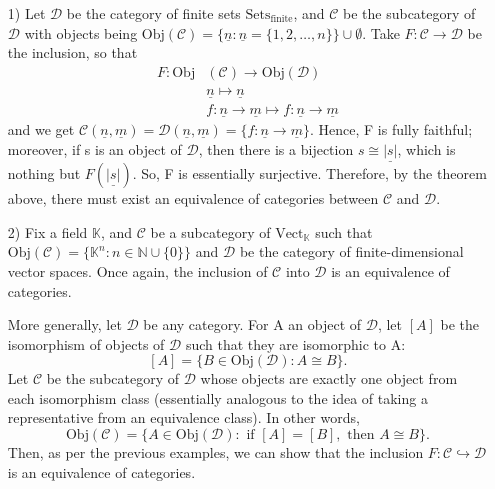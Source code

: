 \documentclass[../category_theory.tex]{subfiles}
\begin{document}
\begin{example}
	\begin{itemize}
		\item[1)]Let \(\mathcal{D}\) be the category of finite sets \(\mathrm{Sets}_{\text{finite}}\), and \(\mathcal{C}\) be the subcategory of \(\mathcal{D}\) with objects being \(\mathrm{Obj}(\mathcal{C})=\{\underline{n}: \underline{n}=\{1,2,\dotsc ,n\}\}\cup \emptyset \). Take \(F:\mathcal{C}\rightarrow \mathcal{D}\) be the inclusion, so that
		      \begin{align*}
			      F:\mathrm{Obj} & (\mathcal{C})\rightarrow \mathrm{Obj}(\mathcal{D})                                       \\
			                     & \underline{n}\mapsto \underline{n}                                                       \\
			                     & f:\underline{n}\rightarrow \underline{m}\mapsto f:\underline{n}\rightarrow \underline{m}
		      \end{align*}
		      and we get \(\mathcal{C}(\underline{n}, \underline{m})=\mathcal{D}(\underline{n},\underline{m})=\{f:\underline{n}\rightarrow \underline{m}\}\). Hence, F is fully faithful; moreover, if s is an object of \(\mathcal{D}\), then there is a bijection \(s\cong \underline{|s|}\), which is nothing but \(F(\underline{|s|})\). So, F is essentially surjective. Therefore, by the theorem above, there must exist an equivalence of categories between \(\mathcal{C}\) and \(\mathcal{D}\).
		\item[2)] Fix a field \(\mathbb{K}\), and \(\mathcal{C}\) be a subcategory of \(\mathrm{Vect}_{\mathbb{K}}\) such that \(\mathrm{Obj}(\mathcal{C})=\{\mathbb{K}^{n}: n\in \mathbb{N}\cup \{0\}\}\) and \(\mathcal{D}\) be the category of finite-dimensional vector spaces. Once again, the inclusion of \(\mathcal{C}\) into \(\mathcal{D}\) is an equivalence of categories.

		      More generally, let \(\mathcal{D}\) be any category. For A an object of \(\mathcal{D}\), let \([A]\) be the isomorphism of objects of \(\mathcal{D}\) such that they are isomorphic to A:
		      \[
			      [A]=\{B\in \mathrm{Obj}(\mathcal{D}): A\cong B\}.
		      \]
		      Let \(\mathcal{C}\) be the subcategory of \(\mathcal{D}\) whose objects are exactly one object from each isomorphism class (essentially analogous to the idea of taking a representative from an equivalence class). In other words,
		      \[
			      \mathrm{Obj}(\mathcal{C})=\{A\in \mathrm{Obj}(\mathcal{D}): \text{ if }[A]=[B],\text{ then }A\cong B\}.
		      \]
		      Then, as per the previous examples, we can show that the inclusion \(F:\mathcal{C}\hookrightarrow \mathcal{D} \) is an equivalence of categories.
	\end{itemize}
\end{example}
\end{document}
